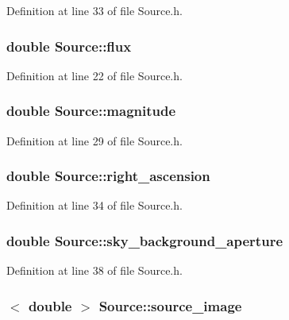 Definition at line 33 of file Source.h.

\hypertarget{classSource_a8888be0016028aa59006fa6d9fc7c575}{
\subsubsection[{flux}]{\setlength{\rightskip}{0pt plus 5cm}double {\bf Source::flux}}}
\label{classSource_a8888be0016028aa59006fa6d9fc7c575}


Definition at line 22 of file Source.h.

\hypertarget{classSource_a6a63845ae2495f7d0b9758e969ae34a5}{
\subsubsection[{magnitude}]{\setlength{\rightskip}{0pt plus 5cm}double {\bf Source::magnitude}}}
\label{classSource_a6a63845ae2495f7d0b9758e969ae34a5}


Definition at line 29 of file Source.h.

\hypertarget{classSource_a3378987660510b2ab4f02db5aa81791e}{
\subsubsection[{right\_\-ascension}]{\setlength{\rightskip}{0pt plus 5cm}double {\bf Source::right\_\-ascension}}}
\label{classSource_a3378987660510b2ab4f02db5aa81791e}


Definition at line 34 of file Source.h.

\hypertarget{classSource_aa21a6313f7ab7c41bb206ed05f0909cc}{
\subsubsection[{sky\_\-background\_\-aperture}]{\setlength{\rightskip}{0pt plus 5cm}double {\bf Source::sky\_\-background\_\-aperture}}}
\label{classSource_aa21a6313f7ab7c41bb206ed05f0909cc}


Definition at line 38 of file Source.h.

\hypertarget{classSource_ae39e6de7004f8f12968f38352c6c0f5e}{
\subsubsection[{source\_\-image}]{$<$ double $>$ {\bf Source::source\_\-image}}}
\label{classSource_ae39e6de7004f8f12968f38352c6c0f5e}


